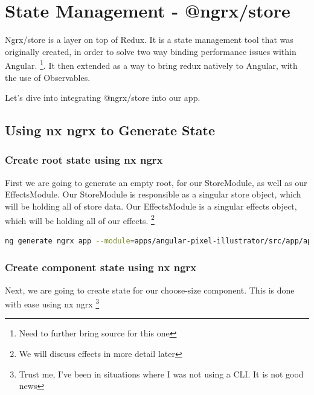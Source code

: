 \maketitle{}
\section{ State Management - @ngrx/store }

Ngrx/store is a layer on top of Redux. It is a state management tool that was
originally created, in order to solve two way binding performance issues within
Angular. \footnote{Need to further bring source for this one}. It then extended
as a way to bring redux natively to Angular, with the use of Observables.

Let's dive into integrating @ngrx/store into our app. 

\subsection{ Using nx ngrx to Generate State }

\subsubsection{ Create root state using nx ngrx }

First we are going to generate an empty root, for our StoreModule, as well as
our EffectsModule. Our StoreModule is responsible as a singular store object,
which will be holding all of store data. Our EffectsModule is a singular effects
object, which will be holding all of our effects. \footnote{We will discuss
effects in more detail later}

\begin{lstlisting}[language=Bash]
ng generate ngrx app --module=apps/angular-pixel-illustrator/src/app/app.module.ts --onlyEmptyRoot
\end{lstlisting}

\subsubsection{ Create component state using nx ngrx }

Next, we are going to create state for our choose-size component. This is done
with ease using nx ngrx \footnote{Trust me, I've been in situations where I
was not using a CLI. It is not good news}

